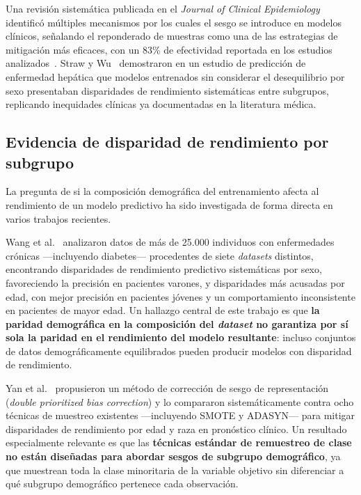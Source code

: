 Una revisión sistemática publicada en el \emph{Journal of Clinical Epidemiology} identificó múltiples mecanismos por los cuales el sesgo se introduce en modelos clínicos, señalando el reponderado de muestras como una de las estrategias de mitigación más eficaces, con un 83\% de efectividad reportada en los estudios analizados~\cite{ricci2024sociodemographic}. Straw y Wu~\cite{straw2022sexbias} demostraron en un estudio de predicción de enfermedad hepática que modelos entrenados sin considerar el desequilibrio por sexo presentaban disparidades de rendimiento sistemáticas entre subgrupos, replicando inequidades clínicas ya documentadas en la literatura médica.

\subsection{Evidencia de disparidad de rendimiento por subgrupo}
\label{subsec:evidencia_disparidad_rendimiento}

La pregunta de si la composición demográfica del entrenamiento afecta al rendimiento de un modelo predictivo ha sido investigada de forma directa en varios trabajos recientes.

Wang et al.~\cite{wang2024disparate} analizaron datos de más de 25.000 individuos con enfermedades crónicas —incluyendo diabetes— procedentes de siete \emph{datasets} distintos, encontrando disparidades de rendimiento predictivo sistemáticas por sexo, favoreciendo la precisión en pacientes varones, y disparidades más acusadas por edad, con mejor precisión en pacientes jóvenes y un comportamiento inconsistente en pacientes de mayor edad. Un hallazgo central de este trabajo es que \textbf{la paridad demográfica en la composición del \emph{dataset} no garantiza por sí sola la paridad en el rendimiento del modelo resultante}: incluso conjuntos de datos demográficamente equilibrados pueden producir modelos con disparidad de rendimiento.

Yan et al.~\cite{yan2022doubleprioritized} propusieron un método de corrección de sesgo de representación (\emph{double prioritized bias correction}) y lo compararon sistemáticamente contra ocho técnicas de muestreo existentes —incluyendo SMOTE y ADASYN— para mitigar disparidades de rendimiento por edad y raza en pronóstico clínico. Un resultado especialmente relevante es que las \textbf{técnicas estándar de remuestreo de clase no están diseñadas para abordar sesgos de subgrupo demográfico}, ya que muestrean toda la clase minoritaria de la variable objetivo sin diferenciar a qué subgrupo demográfico pertenece cada observación.

